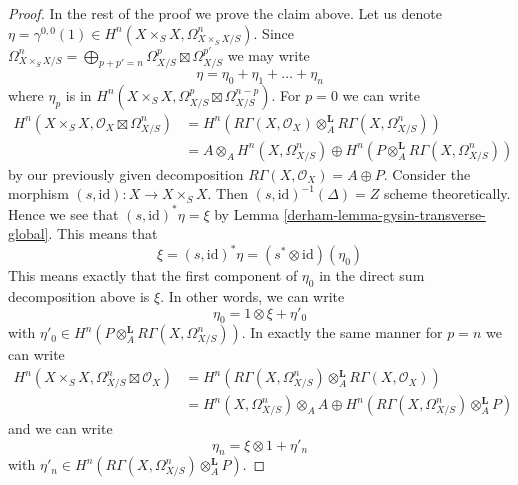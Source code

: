 \begin{proof}
\medskip\noindent
In the rest of the proof we prove the claim above. Let us denote
$\eta = \gamma^{0, 0}(1) \in H^n(X \times_S X, \Omega^n_{X \times_S X/S})$.
Since $\Omega^n_{X \times_S X/S} =
\bigoplus_{p + p' = n} \Omega^p_{X/S} \boxtimes \Omega^{p'}_{X/S}$
we may write
$$
\eta = \eta_0 + \eta_1 + \ldots + \eta_n
$$
where $\eta_p$ is in
$H^n(X \times_S X, \Omega^p_{X/S} \boxtimes \Omega^{n - p}_{X/S})$.
For $p = 0$ we can write
\begin{align*}
H^n(X \times_S X, \mathcal{O}_X \boxtimes \Omega^n_{X/S})
& =
H^n(R\Gamma(X, \mathcal{O}_X) \otimes_A^\mathbf{L}
R\Gamma(X, \Omega^n_{X/S})) \\
& =
A \otimes_A H^n(X, \Omega^n_{X/S}) \oplus
H^n(P \otimes_A^\mathbf{L} R\Gamma(X, \Omega^n_{X/S}))
\end{align*}
by our previously given decomposition $R\Gamma(X, \mathcal{O}_X) = A \oplus P$.
Consider the morphism $(s, \text{id}) : X \to X \times_S X$.
Then $(s, \text{id})^{-1}(\Delta) = Z$ scheme theoretically.
Hence we see that $(s, \text{id})^*\eta = \xi$ by
Lemma \ref{derham-lemma-gysin-transverse-global}. This means that
$$
\xi = (s, \text{id})^*\eta = (s^* \otimes \text{id})(\eta_0)
$$
This means exactly that the first component of $\eta_0$
in the direct sum decomposition above is $\xi$. In other words, we can write
$$
\eta_0 = 1 \otimes \xi + \eta'_0
$$
with $\eta'_0 \in H^n(P \otimes_A^\mathbf{L} R\Gamma(X, \Omega^n_{X/S}))$.
In exactly the same manner for $p = n$ we can write
\begin{align*}
H^n(X \times_S X, \Omega^n_{X/S} \boxtimes \mathcal{O}_X)
& =
H^n(R\Gamma(X, \Omega^n_{X/S}) \otimes_A^\mathbf{L}
R\Gamma(X, \mathcal{O}_X)) \\
& =
H^n(X, \Omega^n_{X/S}) \otimes_A A \oplus
H^n(R\Gamma(X, \Omega^n_{X/S}) \otimes_A^\mathbf{L} P)
\end{align*}
and we can write
$$
\eta_n = \xi \otimes 1 + \eta'_n
$$
with $\eta'_n \in H^n(R\Gamma(X, \Omega^n_{X/S}) \otimes_A^\mathbf{L} P)$.


\end{proof}
